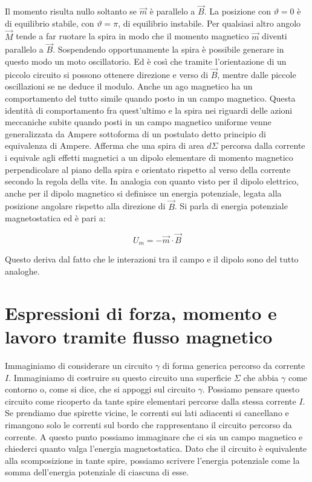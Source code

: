 Il momento risulta nullo soltanto se $\vec{m}$ è parallelo a $\vec{B}$. La posizione con $ \vartheta =0 $ è di equilibrio stabile, con $\vartheta =\pi$, di equilibrio instabile. Per qualsiasi altro angolo $\vec{M}$ tende a far ruotare la spira in modo che il momento magnetico $\vec{m}$ diventi parallelo a $\vec{B}$. Sospendendo opportunamente la spira è possibile generare in questo modo un moto oscillatorio. Ed è così che tramite l'orientazione di un piccolo circuito si possono ottenere direzione e verso di $\vec{B}$, mentre dalle piccole oscillazioni se ne deduce il modulo. Anche un ago magnetico ha un comportamento del tutto simile quando posto in un campo magnetico. Questa identità di comportamento fra quest'ultimo e la spira nei riguardi delle azioni meccaniche subite quando posti in un campo magnetico uniforme venne generalizzata da Ampere sottoforma di un postulato detto principio di equivalenza di Ampere. Afferma che una spira di area $ d\Sigma$ percorsa dalla corrente i equivale agli effetti magnetici a un dipolo elementare di momento magnetico perpendicolare al piano della spira e orientato rispetto al verso della corrente secondo la regola della vite. In analogia con quanto visto per il dipolo elettrico, anche per il dipolo magnetico si definisce un energia potenziale, legata alla posizione angolare rispetto alla direzione di $\vec{B}$. Si parla di energia potenziale magnetostatica ed è pari a:

\[
	\boxed{U_m = -\vec{m} \cdot \vec{B}}
\]

Questo deriva dal fatto che le interazioni tra il campo e il dipolo sono del tutto analoghe.

\section{Espressioni di forza, momento e lavoro tramite flusso magnetico}

Immaginiamo di considerare un circuito $\gamma$ di forma generica percorso da corrente $I$. Immaginiamo di costruire su questo circuito una superficie $\Sigma$ che abbia $\gamma$ come contorno o, come si dice, che si appoggi sul circuito $\gamma$. Possiamo pensare questo circuito come ricoperto da tante spire elementari percorse dalla stessa corrente $I$. Se prendiamo due spirette vicine, le correnti sui lati adiacenti si cancellano e rimangono solo le correnti sul bordo che rappresentano il circuito percorso da corrente. A questo punto possiamo immaginare che ci sia un campo magnetico e chiederci quanto valga l'energia magnetostatica. Dato che il circuito è equivalente alla scomposizione in tante spire, possiamo scrivere l'energia potenziale come la somma dell'energia potenziale di ciascuna di esse.

